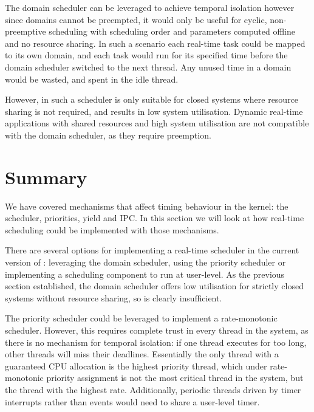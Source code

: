 The domain scheduler can be leveraged to achieve temporal isolation however since domains cannot be preempted, it would only be useful for cyclic, non-preemptive scheduling with scheduling order and parameters computed offline and no resource sharing.
In such a scenario each real-time task could be mapped to its own domain, and each task would run for its specified time before the domain scheduler switched to the next thread.
Any unused time in a domain would be wasted, and spent in the idle thread.

However, in such a scheduler is only suitable for closed systems where resource sharing is not required, and results in low system utilisation.
Dynamic real-time applications with shared resources and high system utilisation are not compatible with the domain scheduler, as they require preemption.

\section{Summary}

We have covered \selfour mechanisms that affect timing behaviour in the kernel: the scheduler, priorities, yield and IPC. 
In this section we will look at how real-time scheduling could be implemented with those mechanisms.

There are several options for implementing a real-time scheduler in the current version of \selfour: leveraging the domain scheduler, using the priority scheduler or implementing a scheduling component to run at user-level. 
As the previous section established, the domain scheduler offers low utilisation for strictly closed systems without resource sharing, so is clearly insufficient.

The priority scheduler could be leveraged to implement a rate-monotonic scheduler.
However, this requires complete trust in every thread in the system, as there is no mechanism for temporal isolation: if one thread executes for too long, other threads will miss their deadlines.
Essentially the only thread with a guaranteed CPU allocation is the highest priority thread, which under rate-monotonic priority assignment is not the most critical thread in the system, but the thread with the highest rate.
Additionally, periodic threads driven by timer interrupts rather than events would need to share a user-level timer.

